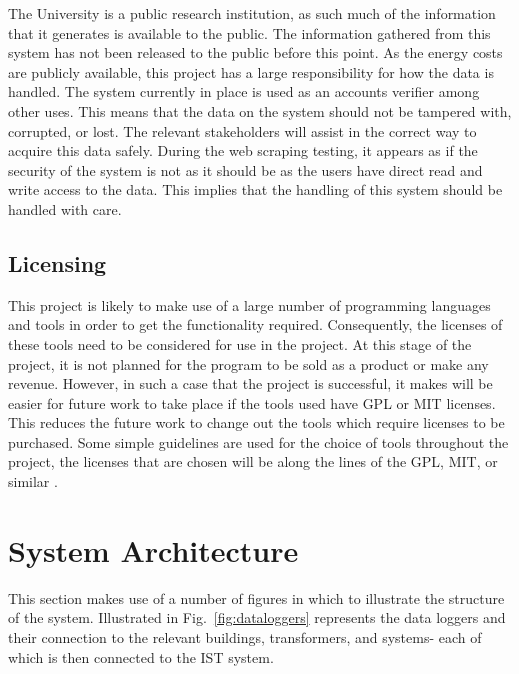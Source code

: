 \documentclass[12pt,onecolumn]{IEEEtran}
\begin{document}
The University is a public research institution, as such much of the information that it generates is available to the public. The information gathered from this system has not been released to the public before this point.  As the energy costs are publicly available, this project has a large responsibility for how the data is handled. The system currently in place is used as an accounts verifier among other uses. This means that the data on the system should not be tampered with, corrupted, or lost.  The relevant stakeholders will assist in the correct way to acquire this data safely. During the web scraping testing, it appears as if the security of the system is not as it should be as the users have direct read and write access to the data.
This implies that the handling of this system should be handled with care.


\subsection{Licensing} \label{sec:Licensing}
This project is likely to make use of a large number of programming languages and tools in order to get the functionality required. Consequently, the licenses of these tools need to be considered for use in the project. At this stage of the project, it is not planned for the program to be sold as a product or make any revenue. 
However, in such a case that the project is successful, it makes will be easier for future work to take place if the tools used have GPL or MIT licenses. This reduces the future work to change out the tools which require licenses to be purchased. Some simple guidelines are used for the choice of tools throughout the project, the licenses that are chosen will be along the lines of the GPL, MIT, or similar \cite{yegor}.


\section{System Architecture} \label{sec:SystemArchitecture}

This section makes use of a number of figures in which to illustrate the structure of the system. 
Illustrated in Fig.~\ref{fig:dataloggers} represents the data loggers and their connection to the relevant buildings, transformers, and systems- each of which is then connected to the IST system.
\end{document}
